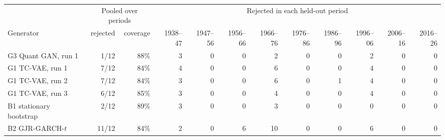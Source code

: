 \begin{tabular}{lrrrrrrrrrrr}
\toprule
& \multicolumn{2}{c}{Pooled over periods} & \multicolumn{9}{c}{Rejected in each held-out period} \\
\cmidrule(lr){2-3}\cmidrule(lr){4-12}
Generator & rejected & coverage & 1938--47 & 1947--56 & 1956--66 & 1966--76 & 1976--86 & 1986--96 & 1996--06 & 2006--16 & 2016--26 \\
\midrule
G3 Quant GAN, run 1 & 1/12 & 88\% & 3 & 0 & 0 & 2 & 0 & 0 & 2 & 0 & 0 \\
\addlinespace
G1 TC-VAE, run 1 & 7/12 & 84\% & 4 & 0 & 0 & 6 & 0 & 0 & 4 & 0 & 0 \\
G1 TC-VAE, run 2 & 7/12 & 84\% & 3 & 0 & 0 & 6 & 0 & 1 & 4 & 0 & 0 \\
G1 TC-VAE, run 3 & 6/12 & 85\% & 3 & 0 & 0 & 4 & 0 & 0 & 4 & 0 & 0 \\
B1 stationary bootstrap & 2/12 & 89\% & 3 & 0 & 0 & 3 & 0 & 0 & 0 & 0 & 0 \\
B2 GJR-GARCH-$t$ & 11/12 & 84\% & 2 & 0 & 6 & 10 & 0 & 0 & 6 & 0 & 0 \\
\bottomrule
\end{tabular}
